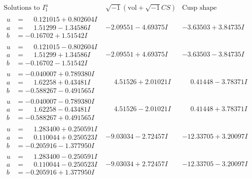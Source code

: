 \documentclass[1p]{elsarticle_modified}
\theoremstyle{definition}
\newcommand{\I}{\sqrt{-1}}
\begin{document}
$$\begin{array}{c|c|c}  
\text{Solutions to }I^u_{1}& \I (\text{vol} + \sqrt{-1}CS) & \text{Cusp shape}\\
 \hline 
\begin{aligned}
u &= \phantom{-}0.121015 + 0.802604 I \\
a &= \phantom{-}1.51299 - 1.34586 I \\
b &= -0.16702 + 1.51542 I\end{aligned}
 & -2.09551 - 4.69375 I & -3.63503 + 3.84735 I \\ \hline\begin{aligned}
u &= \phantom{-}0.121015 - 0.802604 I \\
a &= \phantom{-}1.51299 + 1.34586 I \\
b &= -0.16702 - 1.51542 I\end{aligned}
 & -2.09551 + 4.69375 I & -3.63503 - 3.84735 I \\ \hline\begin{aligned}
u &= -0.040007 + 0.789380 I \\
a &= \phantom{-}1.62258 + 0.43481 I \\
b &= -0.588267 - 0.491565 I\end{aligned}
 & \phantom{-}4.51526 + 2.01021 I & \phantom{-}0.41448 - 3.78371 I \\ \hline\begin{aligned}
u &= -0.040007 - 0.789380 I \\
a &= \phantom{-}1.62258 - 0.43481 I \\
b &= -0.588267 + 0.491565 I\end{aligned}
 & \phantom{-}4.51526 - 2.01021 I & \phantom{-}0.41448 + 3.78371 I \\ \hline\begin{aligned}
u &= \phantom{-}1.283400 + 0.250591 I \\
a &= \phantom{-}0.110044 + 0.250523 I \\
b &= -0.205916 - 1.377950 I\end{aligned}
 & -9.03034 - 2.72457 I & -12.33705 + 3.20097 I \\ \hline\begin{aligned}
u &= \phantom{-}1.283400 - 0.250591 I \\
a &= \phantom{-}0.110044 - 0.250523 I \\
b &= -0.205916 + 1.377950 I\end{aligned}
 & -9.03034 + 2.72457 I & -12.33705 - 3.20097 I \\ \hline\begin{aligned}

\end{aligned}
\end{array}$$
\end{document}
